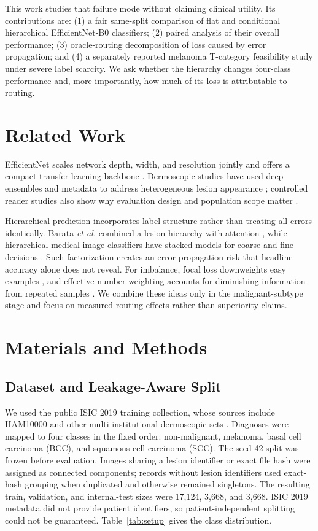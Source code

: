 \documentclass[a4paper,conference]{IEEEtran}
\begin{document}
This work studies that failure mode without claiming clinical utility. Its
contributions are: (1) a fair same-split comparison of flat and conditional
hierarchical EfficientNet-B0 classifiers; (2) paired analysis of their overall
performance; (3) oracle-routing decomposition of loss caused by error
propagation; and (4) a separately reported melanoma T-category feasibility
study under severe label scarcity. We ask whether the hierarchy changes
four-class performance and, more importantly, how much of its loss is
attributable to routing.

\section{Related Work}
EfficientNet scales network depth, width, and resolution jointly and offers a
compact transfer-learning backbone \cite{tan2019}. Dermoscopic studies have
used deep ensembles and metadata to address heterogeneous lesion appearance
\cite{gessert2020}; controlled reader studies also show why evaluation design
and population scope matter \cite{tschandl2020}.

Hierarchical prediction incorporates label structure rather than treating all
errors identically. Barata \emph{et al.} combined a lesion hierarchy with
attention \cite{barata2019}, while hierarchical medical-image classifiers have
stacked models for coarse and fine decisions \cite{kowsari2020}. Such
factorization creates an error-propagation risk that headline accuracy alone
does not reveal. For imbalance, focal loss downweights easy examples
\cite{lin2017}, and effective-number weighting accounts for diminishing
information from repeated samples \cite{cui2019}. We combine these ideas only
in the malignant-subtype stage and focus on measured routing effects rather
than superiority claims.

\section{Materials and Methods}
\subsection{Dataset and Leakage-Aware Split}
We used the public ISIC 2019 training collection, whose sources include
HAM10000 and other multi-institutional dermoscopic sets
\cite{tschandl2018,combalia2019}. Diagnoses were mapped to four classes in the
fixed order: non-malignant, melanoma, basal cell carcinoma (BCC), and squamous
cell carcinoma (SCC). The seed-42 split was frozen before evaluation. Images
sharing a lesion identifier or exact file hash were assigned as connected
components; records without lesion identifiers used exact-hash grouping when
duplicated and otherwise remained singletons. The resulting train,
validation, and internal-test sizes were 17,124, 3,668, and 3,668. ISIC 2019
metadata did not provide patient identifiers, so patient-independent splitting
could not be guaranteed. Table~\ref{tab:setup} gives the class distribution.
\end{document}
